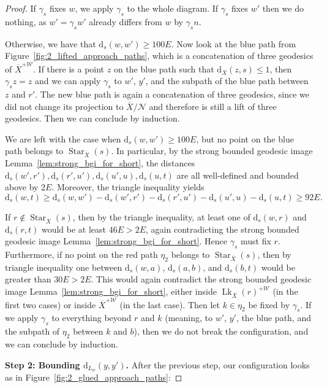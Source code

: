\documentclass[svgnames]{amsart}
\theoremstyle{plain}
\theoremstyle{definition}
\newcommand{\ov}[1]{\overline{#1}}
\newcommand{\dist}{\mathrm{d}}
\newcommand{\link}{\operatorname{Lk}}
\newcommand{\N}{\mathcal{N}}
\newcommand{\W}{\mathcal{W}}
\begin{document}
\begin{proof}
If $\gamma_s$ fixes $w$, we apply $\gamma_s$ to the whole diagram. If $\gamma_s$ fixes $w'$ then we do nothing, as $w'=\gamma_s w'$ already differs from $w$ by $\gamma_s n$. 

Otherwise, we have that $\dist_s(w, w')\ge 100E$. Now look at the blue path from Figure~\eqref{fig:2_lifted_approach_paths}, which is a concatenation of three geodesics of $\ov X^{+\W}$. If there is a point $z$ on the blue path such that $\dist_{\ov X}(z, s)\le 1$, then $\gamma_s z=z$ and we can apply $\gamma_s$ to $w'$, $y'$, and the subpath of the blue path between $z$ and $r'$. The new blue path is again a concatenation of three geodesics, since we did not change its projection to $\ov X/\N$ and therefore is still a lift of three geodesics. Then we can conclude by induction.
\par\medskip
We are left with the case when $\dist_s(w, w')\ge 100E$, but no point on the blue path belongs to $\operatorname{Star}_{\ov X}(s)$. In particular, by the strong bounded geodesic image Lemma~\ref{lem:strong_bgi_for_short}, the distances $\dist_s(w',r'),\dist_s(r',u'),\dist_s(u',u),\dist_s(u,t)$ are all well-defined and bounded above by $2E$. Moreover, the triangle inequality yields
$$\dist_s(w, t)\ge \dist_s(w, w')-\dist_s(w',r')-\dist_s(r',u')-\dist_s(u',u)-\dist_s(u,t) \ge 92E.$$

If $r\not\in \operatorname{Star}_{\ov X}(s)$, then by the triangle inequality, at least one of $\dist_s(w, r)$ and $\dist_s(r, t)$ would be at least $46E>2E$, again contradicting the strong bounded geodesic image Lemma~\ref{lem:strong_bgi_for_short}. Hence $\gamma_s$ must fix $r$. Furthermore, if no point on the red path $\eta_2$ belongs to $\operatorname{Star}_{\ov X}(s)$, then by triangle inequality one between $\dist_s(w, a)$, $\dist_s(a,b)$, and $\dist_s(b, t)$ would be greater than $30E>2E$. This would again contradict the strong bounded geodesic image Lemma~\ref{lem:strong_bgi_for_short}, either inside $\link_{\ov X}(r)^{+\W}$ (in the first two cases) or inside $\ov X^{+\W}$ (in the last case). Then let $k\in \eta_2$ be fixed by $\gamma_s$. If we apply $\gamma_s$ to everything beyond $r$ and $k$ (meaning, to $w'$, $y'$, the blue path, and the subpath of $\eta_2$ between $k$ and $b$), then we do not break the configuration, and we can conclude by induction.


\par\medskip
\textbf{Step 2: Bounding $\dist_{L_w}(y,y')$.} After the previous step, our configuration looks as in Figure~\eqref{fig:2_glued_approach_paths}:


\end{proof}
\end{document}

